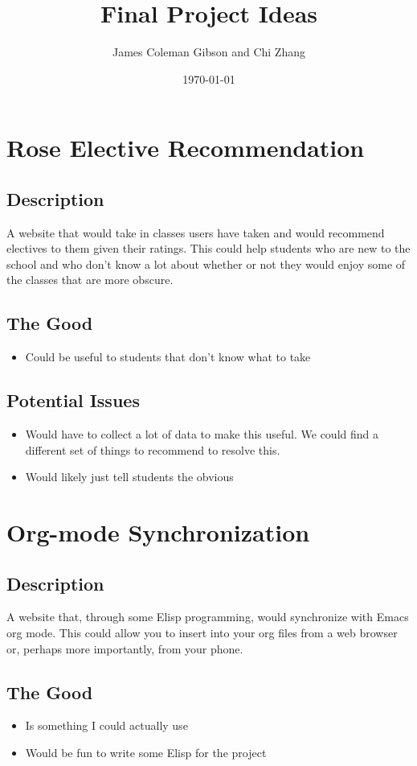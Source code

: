 \documentclass{article}
\title{\Huge \textbf{Final Project Ideas}}
\author{\small James Coleman Gibson and Chi Zhang}
\date{\small \today}
\begin{document}
\maketitle

\section{Rose Elective Recommendation}
\subsection*{Description}
A website that would take in classes users have taken and would recommend
electives to them given their ratings. This could help students who are new to
the school and who don't know a lot about whether or not they would enjoy some
of the classes that are more obscure.
\subsection*{The Good}
\begin{itemize}
\item
  Could be useful to students that don't know what to take
\end{itemize}
\subsection*{Potential Issues}
\begin{itemize}
\item
  Would have to collect a lot of data to make this useful. We could find a
  different set of things to recommend to resolve this.
\item
  Would likely just tell students the obvious
\end{itemize}


\section{Org-mode Synchronization}
\subsection*{Description}
A website that, through some Elisp programming, would synchronize with Emacs
org mode. This could allow you to insert into your org files from a web browser
or, perhaps more importantly, from your phone. 
\subsection*{The Good}
\begin{itemize}
\item
  Is something I could actually use
\item
  Would be fun to write some Elisp for the project
\end{itemize}
\end{document}
